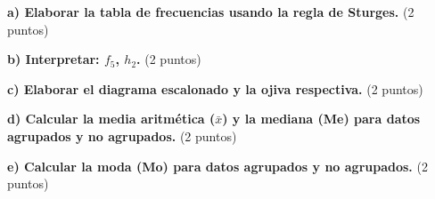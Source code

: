 \documentclass[12pt]{article}
\begin{document}
\textbf{a) Elaborar la tabla de frecuencias usando la regla de Sturges.} (2 puntos)

\textbf{b) Interpretar: $f_5$, $h_2$.} (2 puntos)

\textbf{c) Elaborar el diagrama escalonado y la ojiva respectiva.} (2 puntos)

\textbf{d) Calcular la media aritmética ($\bar{x}$) y la mediana (Me) para datos agrupados y no agrupados.} (2 puntos)

\textbf{e) Calcular la moda (Mo) para datos agrupados y no agrupados.} (2 puntos)
\end{document}
